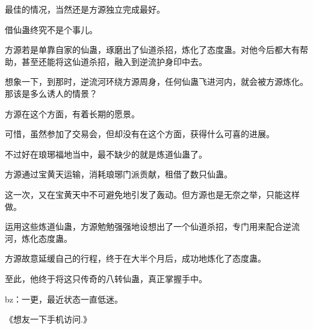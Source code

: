\begin{this_body}
最佳的情况，当然还是方源独立完成最好。

借仙蛊终究不是个事儿。

方源若是单靠自家的仙蛊，琢磨出了仙道杀招，炼化了态度蛊。对他今后都大有帮助，甚至还能将这仙道杀招，融入到逆流护身印中去。

想象一下，到那时，逆流河环绕方源周身，任何仙蛊飞进河内，就会被方源炼化。那该是多么诱人的情景？

方源在这个方面，有着长期的愿景。

可惜，虽然参加了交易会，但却没有在这个方面，获得什么可喜的进展。

不过好在琅琊福地当中，最不缺少的就是炼道仙蛊了。

方源通过宝黄天运输，消耗琅琊门派贡献，租借了数只仙蛊。

这一次，又在宝黄天中不可避免地引发了轰动。但方源也是无奈之举，只能这样做。

运用这些炼道仙蛊，方源勉勉强强地设想出了一个仙道杀招，专门用来配合逆流河，炼化态度蛊。

方源故意延缓自己的行程，终于在大半个月后，成功地炼化了态度蛊。

至此，他终于将这只传奇的八转仙蛊，真正掌握手中。

bz：一更，最近状态一直低迷。

《想友一下手机访问.》

\end{this_body}

